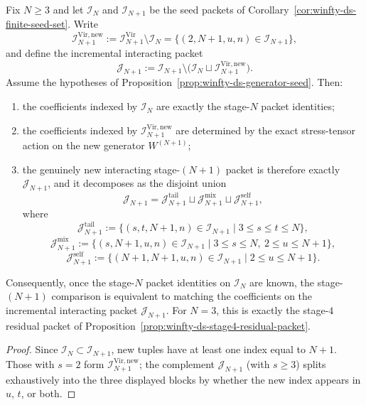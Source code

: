 \begin{proposition}
\label{prop:winfty-ds-stage-growth-packet}
Fix $N \ge 3$ and let $\mathcal{I}_N$ and $\mathcal{I}_{N+1}$ be the
seed packets of Corollary~\ref{cor:winfty-ds-finite-seed-set}.  Write
\[
\mathcal{I}_{N+1}^{\mathrm{Vir,new}}
:=
\mathcal{I}_{N+1}^{\mathrm{Vir}}\setminus \mathcal{I}_N
=
\{(2,N{+}1,u,n)\in \mathcal{I}_{N+1}\},
\]
and define the incremental interacting packet
\[
\mathcal{J}_{N+1}
:=
\mathcal{I}_{N+1}\setminus
\bigl(\mathcal{I}_N\sqcup \mathcal{I}_{N+1}^{\mathrm{Vir,new}}\bigr).
\]
Assume the hypotheses of
Proposition~\ref{prop:winfty-ds-generator-seed}.  Then:
\begin{enumerate}
\item the coefficients indexed by $\mathcal{I}_N$ are exactly the
  stage-$N$ packet identities;
\item the coefficients indexed by
  $\mathcal{I}_{N+1}^{\mathrm{Vir,new}}$ are determined by the exact
  stress-tensor action on the new generator $W^{(N+1)}$;
\item the genuinely new interacting stage-$(N+1)$ packet is therefore
  exactly $\mathcal{J}_{N+1}$, and it decomposes as the disjoint union
  \[
  \mathcal{J}_{N+1}
  =
  \mathcal{J}_{N+1}^{\mathrm{tail}}
  \sqcup
  \mathcal{J}_{N+1}^{\mathrm{mix}}
  \sqcup
  \mathcal{J}_{N+1}^{\mathrm{self}},
  \]
  where
  \[
  \mathcal{J}_{N+1}^{\mathrm{tail}}
  :=
  \{(s,t,N{+}1,n)\in\mathcal{I}_{N+1}\mid 3\le s\le t\le N\},
  \]
  \[
  \mathcal{J}_{N+1}^{\mathrm{mix}}
  :=
  \{(s,N{+}1,u,n)\in\mathcal{I}_{N+1}\mid 3\le s\le N,\ 2\le u\le N{+}1\},
  \]
  \[
  \mathcal{J}_{N+1}^{\mathrm{self}}
  :=
  \{(N{+}1,N{+}1,u,n)\in\mathcal{I}_{N+1}\mid 2\le u\le N{+}1\}.
  \]
\end{enumerate}
Consequently, once the stage-$N$ packet identities on $\mathcal{I}_N$
are known, the stage-$(N+1)$ comparison is equivalent to matching the
coefficients on the incremental interacting packet $\mathcal{J}_{N+1}$.
For $N=3$, this is exactly the stage-$4$ residual packet of
Proposition~\ref{prop:winfty-ds-stage4-residual-packet}.
\end{proposition}

\begin{proof}
Since $\mathcal{I}_N\subset \mathcal{I}_{N+1}$, new tuples have at least one index equal to $N{+}1$.  Those with $s=2$ form $\mathcal{I}_{N+1}^{\mathrm{Vir,new}}$; the complement $\mathcal{J}_{N+1}$ (with $s\geq 3$) splits exhaustively into the three displayed blocks by whether the new index appears in $u$, $t$, or both.
\end{proof}

